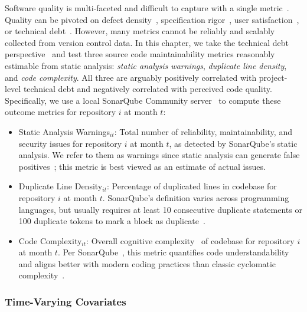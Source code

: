 Software quality is multi-faceted and difficult to capture with a single metric~\cite{DBLP:journals/sigmetrics/CavanoM78, DBLP:journals/software/KitchenhamP96, DBLP:journals/csur/Osterweil96}. Quality can be pivoted on defect density~\cite{DBLP:journals/cacm/Grady93}, specification rigor~\cite{farbey1990software}, user satisfaction~\cite{denning1992software}, or technical debt~\cite{DBLP:conf/sigsoft/ErnstBONG15}. 
However, many metrics cannot be reliably and scalably collected from version control data.
In this chapter, we take the technical debt perspective~\cite{martin2009clean} and test three source code maintainability metrics reasonably estimable from static analysis: \emph{static analysis warnings}, \emph{duplicate line density}, and \emph{code complexity}.
All three are arguably positively correlated with project-level technical debt and negatively correlated with perceived code quality. 
Specifically, we use a local SonarQube Community server~\cite{sonarqube} to compute these outcome metrics for repository $i$ at month $t$:
\begin{itemize}[leftmargin=15pt]
    \item Static Analysis Warnings$_{it}$: Total number of reliability, maintainability, and security issues for repository $i$ at month $t$, as detected by SonarQube's static analysis. We refer to them as warnings since static analysis can generate false positives~\cite{DBLP:journals/tse/GuoTLLLYLCDZ23}; this metric is best viewed as an estimate of actual issues.
    \item Duplicate Line Density$_{it}$: Percentage of duplicated lines in codebase for repository $i$ at month $t$. SonarQube's definition varies across programming languages, but usually requires at least 10 consecutive duplicate statements or 100 duplicate tokens to mark a block as duplicate~\cite{sonarqube-metrics}.
    \item Code Complexity$_{it}$: Overall cognitive complexity~\cite{DBLP:conf/icse/Campbell18} of codebase for repository $i$ at month $t$. Per SonarQube~\cite{DBLP:conf/icse/Campbell18}, this metric quantifies code understandability and aligns better with modern coding practices than classic cyclomatic complexity~\cite{DBLP:journals/tse/McCabe76}.
\end{itemize}

\subsubsection{Time-Varying Covariates}
\label{sec:covariates}

